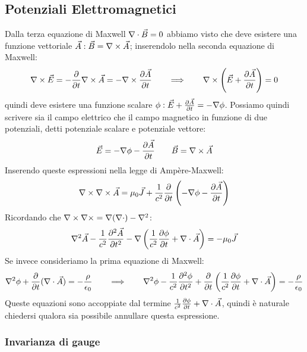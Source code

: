 \subsection{Potenziali Elettromagnetici}

Dalla terza equazione di Maxwell $ \nabla\cdot\vec{B} = 0 $ abbiamo visto che deve esistere una funzione vettoriale $ \vec{A} : \vec{B} = \nabla\times\vec{A} $; inserendolo nella seconda equazione di Maxwell:
\begin{equation}
	\nabla\times\vec{E} = -\frac{\partial}{\partial t} \nabla\times\vec{A} = - \nabla\times \frac{\partial\vec{A}}{\partial t} \qquad\Longrightarrow\qquad \nabla\times\left(\vec{E} + \frac{\partial\vec{A}}{\partial t}\right) = 0
	\label{eq:71}
\end{equation}
quindi deve esistere una funzione scalare $ \phi : \vec{E} + \frac{\partial\vec{A}}{\partial t} = -\nabla\phi $. Possiamo quindi scrivere sia il campo elettrico che il campo magnetico in funzione di due potenziali, detti potenziale scalare e potenziale vettore:
\begin{equation}
	\vec{E} = - \nabla\phi - \frac{\partial\vec{A}}{\partial t} \qquad \vec{B} = \nabla\times\vec{A}
	\label{eq:72}
\end{equation}
Inserendo queste espressioni nella legge di Ampère-Maxwell:
\begin{equation}
	\nabla\times\nabla\times\vec{A} = \mu_0 \vec{J} + \frac{1}{c^2} \frac{\partial}{\partial t} \left(-\nabla\phi - \frac{\partial\vec{A}}{\partial t}\right)
	\label{eq:73}
\end{equation}
Ricordando che $ \nabla\times\nabla\times = \nabla(\nabla\cdot) - \nabla^2 $:
\begin{equation}
	\nabla^2\vec{A} - \frac{1}{c^2} \frac{\partial^2\vec{A}}{\partial t^2} - \nabla\left( \frac{1}{c^2} \frac{\partial\phi}{\partial t} + \nabla\cdot\vec{A} \right) = -\mu_0 \vec{J}
	\label{eq:74}
\end{equation}
Se invece consideriamo la prima equazione di Maxwell:
\begin{equation}
	\nabla^2\phi + \frac{\partial}{\partial t} (\nabla\cdot\vec{A}) = -\frac{\rho}{\epsilon_0} \qquad\Longrightarrow\qquad \nabla^2 \phi - \frac{1}{c^2} \frac{\partial^2 \phi}{\partial t^2} + \frac{\partial}{\partial t} \left( \frac{1}{c^2} \frac{\partial\phi}{\partial t} + \nabla\cdot\vec{A} \right) = -\frac{\rho}{\epsilon_0}
	\label{eq:75}
\end{equation}
Queste equazioni sono accoppiate dal termine $ \frac{1}{c^2} \frac{\partial\phi}{\partial t} + \nabla\cdot\vec{A} $, quindi è naturale chiedersi qualora sia possibile annullare questa espressione. 

\subsubsection{Invarianza di gauge}

